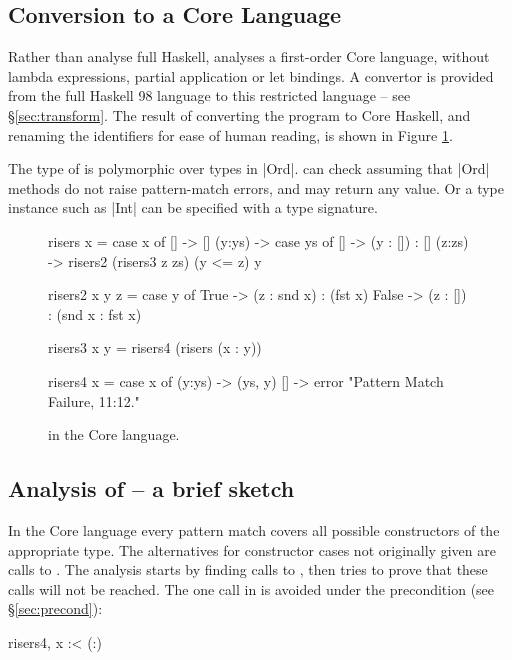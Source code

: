 \subsection{Conversion to a Core Language}

Rather than analyse full Haskell, \catch{} analyses a first-order Core language, without lambda expressions, partial application or let bindings. A convertor is provided from the full Haskell 98 language to this restricted language -- see \S\ref{sec:transform}. The result of converting the  program to Core Haskell, and renaming the identifiers for ease of human reading, is shown in Figure \ref{fig:risers_core}.

The type of  is polymorphic over types in |Ord|. \catch{} can check  assuming that |Ord| methods do not raise pattern-match errors, and may return any value. Or a type instance such as |Int| can be specified with a type signature.

\begin{figure}
\begin{code}
risers x = case x of
    [] -> []
    (y:ys) ->  case ys of
         [] -> (y : []) : []
         (z:zs) -> risers2 (risers3 z zs) (y <= z) y

risers2 x y z =  case y of
    True -> (z : snd x) : (fst x)
    False -> (z : []) : (snd x : fst x)

risers3 x y = risers4 (risers (x : y))

risers4 x = case x of
    (y:ys) -> (ys, y)
    [] -> error "Pattern Match Failure, 11:12."
\end{code}
\caption{ in the Core language.}
\label{fig:risers_core}
\figureend
\end{figure}

\subsection{Analysis of  -- a brief sketch}

In the Core language every pattern match covers all possible constructors of the appropriate type. The alternatives for constructor cases not originally given are calls to . The analysis starts by finding calls to , then tries to prove that these calls will not be reached. The one  call in  is avoided under the precondition (see \S\ref{sec:precond}):

\ignore\begin{code}
risers4, x :< (:)
\end{code}

